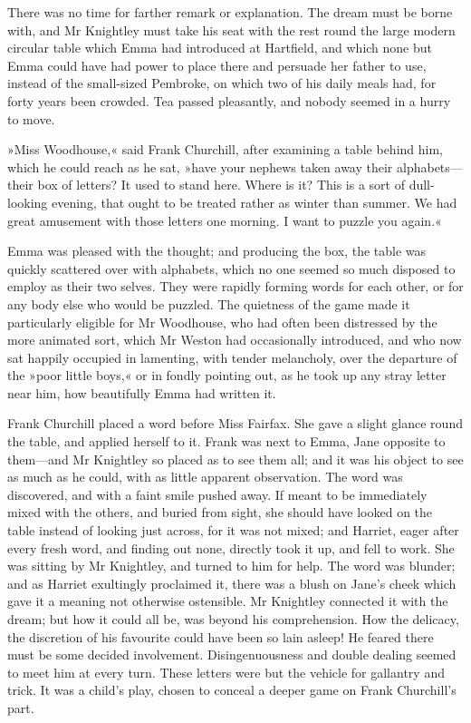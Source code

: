 There was no time for farther remark or explanation. The dream must be borne with, and Mr Knightley must take his seat with the rest round the large modern circular table which Emma had introduced at Hartfield, and which none but Emma could have had power to place there and persuade her father to use, instead of the small-sized Pembroke, on which two of his daily meals had, for forty years been crowded. Tea passed pleasantly, and nobody seemed in a hurry to move.

»Miss Woodhouse,« said Frank Churchill, after examining a table behind him, which he could reach as he sat, »have your nephews taken away their alphabets—their box of letters? It used to stand here. Where is it? This is a sort of dull-looking evening, that ought to be treated rather as winter than summer. We had great amusement with those letters one morning. I want to puzzle you again.«

Emma was pleased with the thought; and producing the box, the table was quickly scattered over with alphabets, which no one seemed so much disposed to employ as their two selves. They were rapidly forming words for each other, or for any body else who would be puzzled. The quietness of the game made it particularly eligible for Mr Woodhouse, who had often been distressed by the more animated sort, which Mr Weston had occasionally introduced, and who now sat happily occupied in lamenting, with tender melancholy, over the departure of the »poor little boys,« or in fondly pointing out, as he took up any stray letter near him, how beautifully Emma had written it.

Frank Churchill placed a word before Miss Fairfax. She gave a slight glance round the table, and applied herself to it. Frank was next to Emma, Jane opposite to them—and Mr Knightley so placed as to see them all; and it was his object to see as much as he could, with as little apparent observation. The word was discovered, and with a faint smile pushed away. If meant to be immediately mixed with the others, and buried from sight, she should have looked on the table instead of looking just across, for it was not mixed; and Harriet, eager after every fresh word, and finding out none, directly took it up, and fell to work. She was sitting by Mr Knightley, and turned to him for help. The word was blunder; and as Harriet exultingly proclaimed it, there was a blush on Jane's cheek which gave it a meaning not otherwise ostensible. Mr Knightley connected it with the dream; but how it could all be, was beyond his comprehension. How the delicacy, the discretion of his favourite could have been so lain asleep! He feared there must be some decided involvement. Disingenuousness and double dealing seemed to meet him at every turn. These letters were but the vehicle for gallantry and trick. It was a child's play, chosen to conceal a deeper game on Frank Churchill's part.

